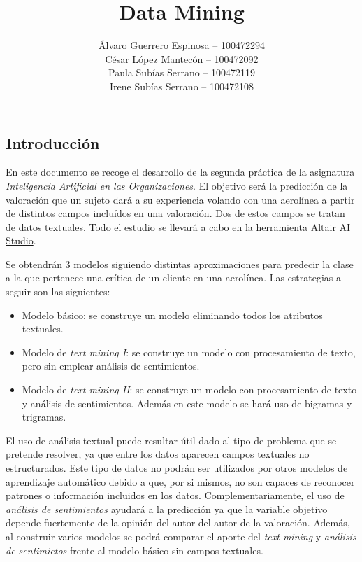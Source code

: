 \documentclass[es]{uc3mreport}
\author{
    Álvaro Guerrero Espinosa -- 100472294 \\
    César López Mantecón -- 100472092 \\
    Paula Subías Serrano -- 100472119 \\
    Irene Subías Serrano -- 100472108
}
\title{Data Mining}
\begin{document}
  \makecover[new]

  \tableofcontents
  \listoffigures
  \listoftables

  \begin{report}

\section{Introducción}
\label{chap:intro}
En este documento se recoge el desarrollo de la segunda práctica de la asignatura \textit{Inteligencia Artificial en las Organizaciones}. El objetivo será la predicción de la valoración que un sujeto dará a su experiencia volando con una aerolínea a partir de distintos campos incluídos en una valoración. Dos de estos campos se tratan de datos textuales. Todo el estudio se llevará a cabo en la herramienta \href{https://altair.com/altair-ai-studio}{Altair AI Studio}.

Se obtendrán 3 modelos siguiendo distintas aproximaciones para predecir la clase a la que pertenece una crítica de un cliente en una aerolínea. Las estrategias a seguir son las siguientes: 

\begin{itemize}
    \item Modelo básico: se construye un modelo eliminando todos los atributos textuales.
    \item Modelo de \textit{text mining I}: se construye un modelo con procesamiento de texto, pero sin emplear análisis de sentimientos.
    \item Modelo de \textit{text mining II}: se construye un modelo con procesamiento de texto y análisis de sentimientos. Además en este modelo se hará uso de bigramas y trigramas.
\end{itemize}

El uso de análisis textual puede resultar útil dado al tipo de problema que se pretende resolver, ya que entre los datos aparecen campos textuales no estructurados. Este tipo de datos no podrán ser utilizados por otros modelos de aprendizaje automático debido a que, por si mismos, no son capaces de reconocer patrones o información incluidos en los datos. Complementariamente, el uso de \textit{análisis de sentimientos} ayudará a la predicción ya que la variable objetivo depende fuertemente de la opinión del autor del autor de la valoración. Además, al construir varios modelos se podrá comparar el aporte del \textit{text mining} y \textit{análisis de sentimietos} frente al modelo básico sin campos textuales.


\end{report}
\end{document}
